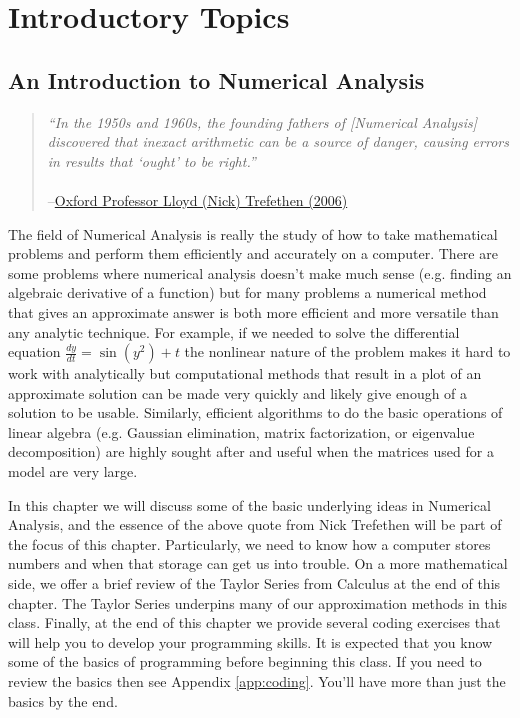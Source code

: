\mainmatter
\chapter{Introductory Topics}\label{ch:intro}

\section{An Introduction to Numerical Analysis}
\begin{quote}
    {\it ``In the 1950s and 1960s, the founding fathers of [Numerical Analysis] discovered that
    inexact arithmetic can be a source of danger, causing errors in results that `ought'
to be right.''} \\
\\ --\href{https://en.wikipedia.org/wiki/Nick_Trefethen}{Oxford Professor Lloyd (Nick)
Trefethen (2006)}
\end{quote}

The field of Numerical Analysis is really the study of how to take
mathematical problems and perform them efficiently and accurately on a computer.  There
are some problems where numerical analysis doesn't make much sense (e.g. finding an
algebraic derivative of a function) but for many problems a numerical method that gives an
approximate answer is both more efficient and more versatile than any analytic technique.
For example, if we needed to solve the differential equation $\frac{dy}{dt} = \sin(y^2) +
t$ the nonlinear nature of the problem makes it hard to work with analytically but
computational methods that result in a plot of an approximate solution can be made very
quickly and likely give enough of a solution to be usable.  Similarly, efficient
algorithms to do the basic operations of linear algebra (e.g. Gaussian elimination, matrix
factorization, or eigenvalue decomposition) are highly sought after and useful when
the matrices used for a model are very large. 

In this chapter we will discuss some of the basic underlying ideas in
Numerical Analysis, and the essence of the above quote from Nick Trefethen will be part of the focus of this chapter.
Particularly, we need to know how a computer stores numbers and when that storage can get
us into trouble.  On a more mathematical side, we offer a brief review of the Taylor
Series from Calculus at the end of this chapter. The Taylor Series underpins many of our approximation methods in
this class.  Finally, at the end of this chapter we provide several coding exercises that
will help you to develop your programming skills.  It is expected that you know some of
the basics of \ProgLang programming before beginning this class.  If you need to review the
basics then see Appendix \ref{app:coding}.  You'll have more
than just the basics by the end.

